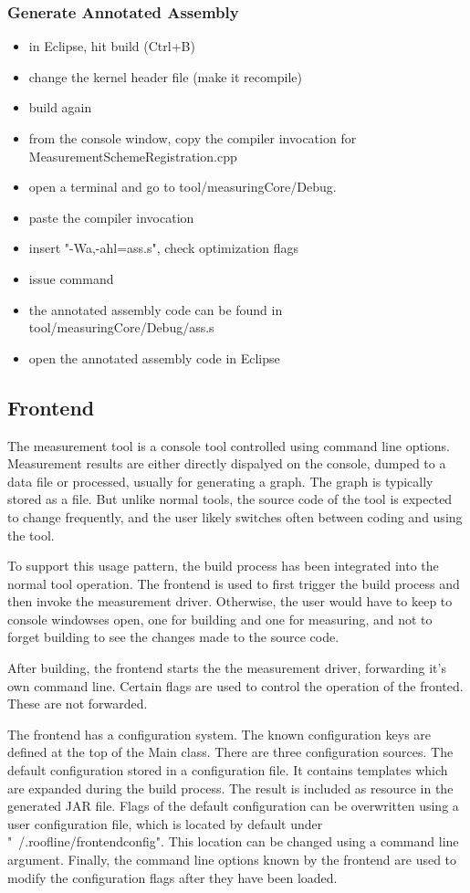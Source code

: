 \documentclass[a4paper,12pt]{article}
\begin{document}
\subsubsection{Generate Annotated Assembly}
\begin{itemize}
\item in Eclipse, hit build (Ctrl+B)
\item change the kernel header file (make it recompile)
\item build again
\item from the console window, copy the compiler invocation for MeasurementSchemeRegistration.cpp
\item open a terminal and go to tool/measuringCore/Debug.
\item paste the compiler invocation
\item insert "-Wa,-ahl=ass.s", check optimization flags
\item issue command
\item the annotated assembly code can be found in tool/measuringCore/Debug/ass.s
\item open the annotated assembly code in Eclipse
\end{itemize}

\subsection{Frontend}
The measurement tool is a console tool controlled using command line options. Measurement results are either directly dispalyed on the console, dumped to a data file or processed, usually for generating a graph. The graph is typically stored as a file. But unlike normal tools, the source code of the tool is expected to change frequently, and the user likely switches often between coding and using the tool.

To support this usage pattern, the build process has been integrated into the normal tool operation. The frontend is used to first trigger the build process and then invoke the measurement driver. Otherwise, the user would have to keep to console windowses open, one for building and one for measuring, and not to forget building to see the changes made to the source code.

After building, the frontend starts the the measurement driver, forwarding it's own command line. Certain flags are used to control the operation of the fronted. These are not forwarded.

The frontend has a configuration system. The known configuration keys are defined at the top of the Main class. There are three configuration sources. The default configuration stored in a configuration file. It contains templates which are expanded during the build process. The result is included as resource in the generated JAR file. Flags of the default configuration can be overwritten using a user configuration file, which is located by default under "~/.roofline/frontendconfig". This location can be changed using a command line argument. Finally, the command line options known by the frontend are used to modify the configuration flags after they have been loaded. 
\end{document}
